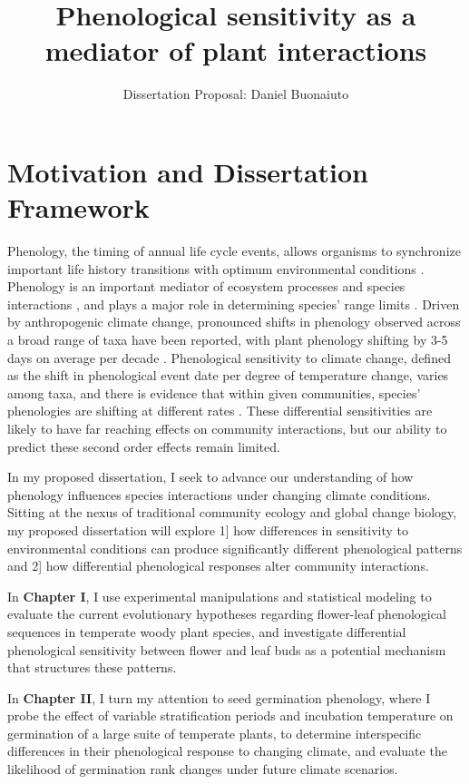 \documentclass[12pt]{article}\usepackage[]{graphicx}\usepackage[]{color}
\begin{document}
\title{Phenological sensitivity as a mediator of plant interactions}
\author{Dissertation Proposal: Daniel Buonaiuto}
\maketitle{}
\section*{Motivation and Dissertation Framework}
\indent\indent Phenology, the timing of annual life cycle events, allows organisms to synchronize important life history transitions with optimum environmental conditions \citep{Forrest2010}. Phenology is an important mediator of ecosystem processes \citep{Piao2007,Cleland2007} and species interactions \citep{Yang2010,Leverett2017}, and plays a major role in determining species' range limits \citep{Chuine2001}. Driven by anthropogenic climate change, pronounced shifts in phenology observed across a broad range of taxa have been reported, with plant phenology shifting by 3-5 days on average per decade \citep{Parmesan2003,Menzel2006,Root2003}. Phenological sensitivity to climate change, defined as the shift in phenological event date per degree of temperature change, varies among taxa, and there is evidence that within given communities, species' phenologies are shifting at different rates \citep{Cleland2012,Ovaskainen2013}. These differential sensitivities are likely to have far reaching effects on community interactions, but our ability to predict these second order effects remain limited.
\par In my proposed dissertation, I seek to advance our understanding of how phenology influences species interactions under changing climate conditions. Sitting at the nexus of traditional community ecology and global change biology, my proposed dissertation will explore 1] how differences in sensitivity to environmental conditions can produce significantly different phenological patterns and 2] how differential phenological responses alter community interactions.
\par In \textbf{Chapter I}, I use experimental manipulations and statistical modeling to evaluate the current evolutionary hypotheses regarding flower-leaf phenological sequences in temperate woody plant species, and investigate differential phenological sensitivity between flower and leaf buds as a potential mechanism that structures these patterns.
\par In \textbf{Chapter II}, I turn my attention to seed germination phenology, where I probe the effect of variable stratification periods and incubation temperature on germination of a large suite of temperate plants, to determine interspecific differences in their phenological response to changing climate, and evaluate the likelihood of germination rank changes under future climate scenarios.
\end{document}
